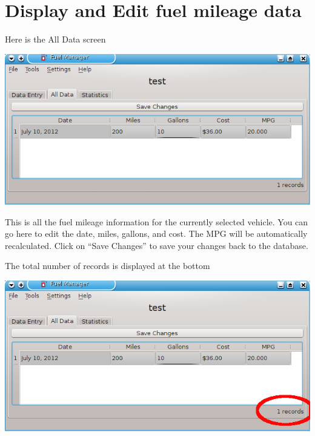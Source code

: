 \chapter{Display and Edit fuel mileage data}
Here is the All Data screen
  \begin{center}
    \includegraphics{snapshot7}
  \end{center}
This is all the fuel mileage information for the currently selected vehicle.
You can go here to edit the date, miles, gallons, and cost.  The MPG will be automatically
recalculated.
Click on ``Save Changes'' to save your changes back to the database.

The total number of records is displayed at the bottom
  \begin{center}
    \includegraphics{snapshot7a}
  \end{center}
